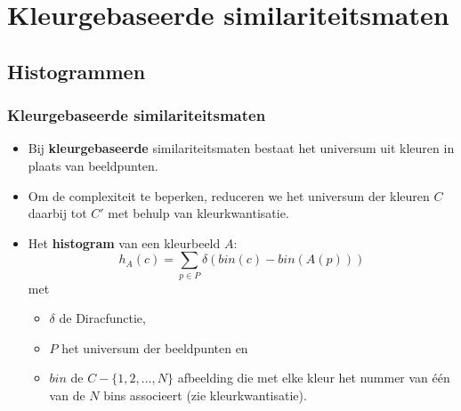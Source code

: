 \documentclass[dutch]{beamer}
\theoremstyle{definition}
\theoremstyle{remark}
\theoremstyle{example}
\begin{document}
\section{Kleurgebaseerde similariteitsmaten}
\subsection{Histogrammen}
\frame
{
  \frametitle{Kleurgebaseerde similariteitsmaten}

  \begin{itemize}
  \item Bij \textbf{kleurgebaseerde} similariteitsmaten bestaat het universum
  uit kleuren in plaats van beeldpunten. 
  \item Om de complexiteit te beperken,
  reduceren we het universum der kleuren $C$ daarbij tot $C'$ met behulp van
  kleurkwantisatie.
  \item Het \textbf{histogram} van een kleurbeeld $A$:
  \begin{displaymath}
  h_A(c) = \sum_{p \in P} \delta (bin(c) - bin(A(p))) 
  \end{displaymath} 
  met 
  \begin{itemize}
    \item $\delta$ de Diracfunctie, 
    \item $P$ het universum der beeldpunten en 
    \item $bin$ de $C - \{1,2,\ldots,N\}$ afbeelding die met 
    elke kleur het nummer van \'e\'en van de $N$ bins associeert (zie kleurkwantisatie).
  \end{itemize}
  \end{itemize}
}
\frame
\end{document}
